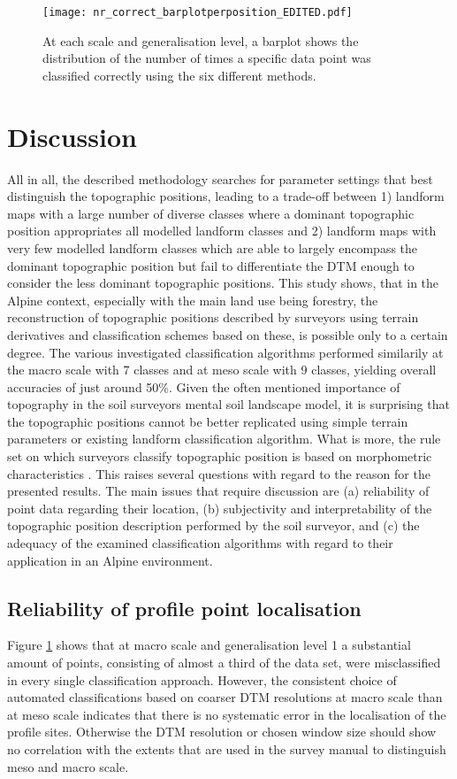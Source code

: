 \documentclass[final,1p,times,twocolumn,authoryear]{elsarticle}
\begin{document}
\begin{figure}
\texttt{[image: nr\_correct\_barplotperposition\_EDITED.pdf]}
\caption{At each scale and generalisation level, a barplot shows the distribution of the number of times a specific data point was classified correctly using the six different methods.}
\label{fig:hist_correct_per_tp}
\end{figure}


\section{Discussion}
All in all, the described methodology searches for parameter settings that best distinguish the topographic positions, leading to a trade-off between 1) landform maps with a large number of diverse classes where a dominant topographic position appropriates all modelled landform classes and 2) landform maps with very few modelled landform classes which are able to largely encompass the dominant topographic position but fail to differentiate the DTM enough to consider the less dominant topographic positions.
This study shows, that in the Alpine context, especially with the main land use being forestry, the reconstruction of topographic positions described by surveyors using terrain derivatives and classification schemes based on these, is possible only to a certain degree. The various investigated classification algorithms performed similarily at the  macro scale with 7 classes and at meso scale with 9 classes, yielding overall accuracies of just around 50\%. Given the often mentioned importance of topography in the soil surveyors mental soil landscape model, it is surprising that the topographic positions cannot be better replicated using simple terrain parameters or existing landform classification algorithm. What is more, the rule set on which surveyors classify topographic position is based on morphometric characteristics \citep{Englisch1998}. This raises several questions with regard to the reason for the presented results. The main issues that require discussion are (a) reliability of point data regarding their location, (b) subjectivity and interpretability of the topographic position description performed by the soil surveyor, and (c) the adequacy of the examined classification algorithms with regard to their application in an Alpine environment. 



\subsection{Reliability of profile point localisation} 
Figure \ref{fig:hist_correct_per_tp} shows that at macro scale and generalisation level 1 a substantial amount of points, consisting of almost a third of the data set, were misclassified in every single classification approach. However, the consistent choice of automated classifications based on coarser  DTM resolutions at macro scale than at meso scale indicates that there is no systematic error in the localisation of the profile sites. Otherwise the DTM resolution or chosen window size should show no correlation with the extents that are used in the survey manual to distinguish meso and macro scale. 
\end{document}

